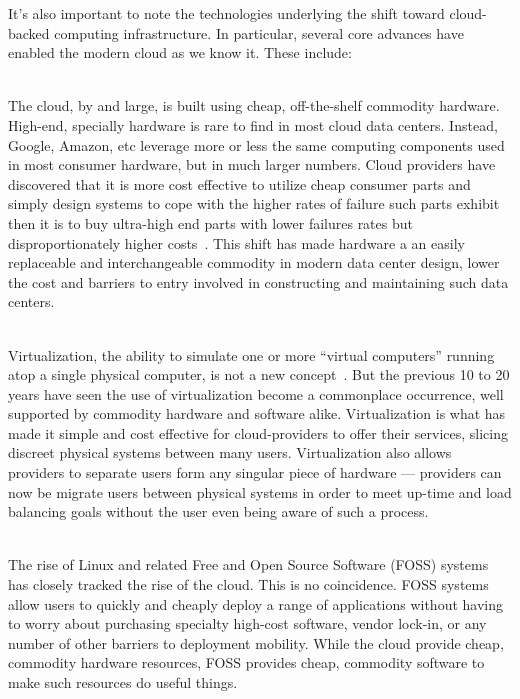 It's also important to note the technologies underlying the shift
toward cloud-backed computing infrastructure. In particular, several
core advances have enabled the modern cloud as we know it. These
include:

\begin{packed_desc}
\item[Commoditization of Hardware] \hfill \\ The cloud, by and large,
  is built using cheap, off-the-shelf commodity hardware. High-end,
  specially hardware is rare to find in most cloud data
  centers. Instead, Google, Amazon, etc leverage more or less the same
  computing components used in most consumer hardware, but in much
  larger numbers. Cloud providers have discovered that it is more cost
  effective to utilize cheap consumer parts and simply design systems
  to cope with the higher rates of failure such parts exhibit then it
  is to buy ultra-high end parts with lower failures rates but
  disproportionately higher costs~\cite{}. This shift has made
  hardware a an easily replaceable and interchangeable commodity in
  modern data center design, lower the cost and barriers to entry
  involved in constructing and maintaining such data centers.
\item[Virtualization] \hfill \\ Virtualization, the ability to
  simulate one or more ``virtual computers'' running atop a single
  physical computer, is not a new concept~\cite{Goldberg1974}. But the
  previous 10 to 20 years have seen the use of virtualization become a
  commonplace occurrence, well supported by commodity hardware and
  software alike. Virtualization is what has made it simple and cost
  effective for cloud-providers to offer their services, slicing
  discreet physical systems between many users. Virtualization also
  allows providers to separate users form any singular piece of
  hardware --- providers can now be migrate users between physical
  systems in order to meet up-time and load balancing goals without
  the user even being aware of such a process.
\item[Free and Open Source Software] \hfill \\ The rise of Linux and
  related Free and Open Source Software (FOSS) systems has closely
  tracked the rise of the cloud. This is no coincidence. FOSS systems
  allow users to quickly and cheaply deploy a range of applications
  without having to worry about purchasing specialty high-cost
  software, vendor lock-in, or any number of other barriers to
  deployment mobility. While the cloud provide cheap, commodity
  hardware resources, FOSS provides cheap, commodity software to make
  such resources do useful things.
\end{packed_desc}

